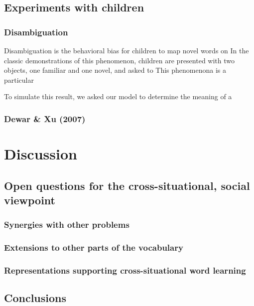 \documentclass[man,noapacite,12pt]{apa2}
\begin{document}
\subsection{Experiments with children}

\subsubsection{Disambiguation}
Disambiguation is the behavioral bias for children to map novel words on  In the classic demonstrations of this phenomenon, children are presented with two objects, one familiar and one novel, and asked to This phenomenona is a particular

To simulate this result, we asked our model to determine the meaning of a 

\subsubsection{Dewar \& Xu (2007)}



\section{Discussion}



\subsection{Open questions for the cross-situational, social viewpoint}

\subsubsection{Synergies with other problems}

\subsubsection{Extensions to other parts of the vocabulary}

\subsubsection{Representations supporting cross-situational word learning}

\cite{yurovskyunderreview}

\subsection{Conclusions}

\newpage



\end{document}
